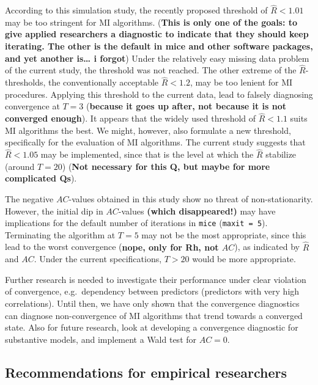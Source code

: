 \documentclass[Royal,times,sageh]{sagej}
\begin{document}
According to this simulation study, the recently proposed threshold of
\(\widehat{R}<1.01\) may be too stringent for MI algorithms.
(\textbf{This is only one of the goals: to give applied researchers a
diagnostic to indicate that they should keep iterating. The other is the
default in mice and other software packages, and yet another is\ldots{}
i forgot}) Under the relatively easy missing data problem of the current
study, the threshold was not reached. The other extreme of the
\(\widehat{R}\)-thresholds, the conventionally acceptable
\(\widehat{R} <1.2\), may be too lenient for MI procedures. Applying
this threshold to the current data, lead to falsely diagnosing
convergence at \(T = 3\) (\textbf{because it goes up after, not because
it is not converged enough}). It appears that the widely used threshold
of \(\widehat{R} < 1.1\) suits MI algorithms the best. We might,
however, also formulate a new threshold, specifically for the evaluation
of MI algorithms. The current study suggests that \(\widehat{R} < 1.05\)
may be implemented, since that is the level at which the \(\widehat{R}\)
stabilize (around \(T = 20\)) (\textbf{Not necessary for this Q, but
maybe for more complicated Qs}).

The negative \(AC\)-values obtained in this study show no threat of
non-stationarity. However, the initial dip in \(AC\)-values
\textbf{(which disappeared!)} may have implications for the default
number of iterations in \texttt{mice} (\texttt{maxit\ =\ 5}).
Terminating the algorithm at \(T=5\) may not be the most appropriate,
since this lead to the worst convergence (\textbf{nope, only for Rh, not
\(AC\)}), as indicated by \(\widehat{R}\) and \(AC\). Under the current
specifications, \(T>20\) would be more appropriate.

Further research is needed to investigate their performance under clear
violation of convergence, e.g.~dependency between predictors (predictors
with very high correlations). Until then, we have only shown that the
convergence diagnostics can diagnose non-convergence of MI algorithms
that trend towards a converged state. Also for future research, look at
developing a convergence diagnostic for substantive models, and
implement a Wald test for \(AC = 0\).

\hypertarget{recommendations-for-empirical-researchers}{%
\subsection{Recommendations for empirical
researchers}\label{recommendations-for-empirical-researchers}}
\end{document}
